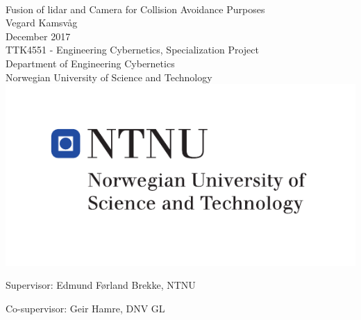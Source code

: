 \thispagestyle{empty}
\mbox{}\\[0pc]
\begin{center}
\Huge{Fusion of lidar and Camera for Collision Avoidance Purposes}\\[2pc]
 
\Large{Vegard Kamsv\aa g}\\[1pc]
\large{December 2017}\\[2pc]
 
TTK4551 - Engineering Cybernetics, Specialization Project\\
Department of Engineering Cybernetics\\
Norwegian University of Science and Technology\\
\vspace{140pt}
\includegraphics[scale=0.8]{fig/logontnu_eng.pdf}
\end{center}
\vfill
 
 
 
\noindent Supervisor: Edmund F\o rland Brekke, NTNU
 
\noindent Co-supervisor: Geir Hamre, DNV GL
 
\cleardoublepage